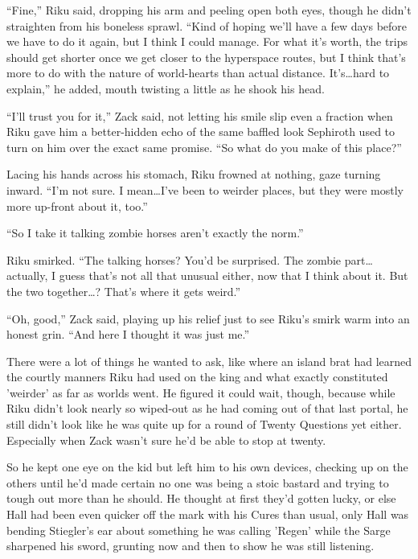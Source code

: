 ``Fine,'' Riku said, dropping his arm and peeling open both eyes, though he didn't straighten from his boneless sprawl. ``Kind of hoping we'll have a few days before we have to do it again, but I think I could manage. For what it's worth, the trips should get shorter once we get closer to the hyperspace routes, but I think that's more to do with the nature of world-hearts than actual distance. It's\ldots hard to explain,'' he added, mouth twisting a little as he shook his head.

``I'll trust you for it,'' Zack said, not letting his smile slip even a fraction when Riku gave him a better-hidden echo of the same baffled look Sephiroth used to turn on him over the exact same promise. ``So what do you make of this place?''

Lacing his hands across his stomach, Riku frowned at nothing, gaze turning inward. ``I'm not sure. I mean\ldots I've been to weirder places, but they were mostly more up-front about it, too.''

``So I take it talking zombie horses aren't exactly the norm.''

Riku smirked. ``The talking horses? You'd be surprised. The zombie part\ldots actually, I guess that's not all that unusual either, now that I think about it. But the two together\ldots ? That's where it gets weird.''

``Oh, good,'' Zack said, playing up his relief just to see Riku's smirk warm into an honest grin. ``And here I thought it was just me.''

There were a lot of things he wanted to ask, like where an island brat had learned the courtly manners Riku had used on the king and what exactly constituted 'weirder' as far as worlds went. He figured it could wait, though, because while Riku didn't look nearly so wiped-out as he had coming out of that last portal, he still didn't look like he was quite up for a round of Twenty Questions yet either. Especially when Zack wasn't sure he'd be able to stop at twenty.

So he kept one eye on the kid but left him to his own devices, checking up on the others until he'd made certain no one was being a stoic bastard and trying to tough out more than he should. He thought at first they'd gotten lucky, or else Hall had been even quicker off the mark with his Cures than usual, only Hall was bending Stiegler's ear about something he was calling 'Regen' while the Sarge sharpened his sword, grunting now and then to show he was still listening.

